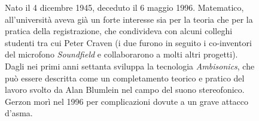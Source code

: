 \vfill\null

\begin{figure}[bh]
\begin{bio}
  Nato il 4 dicembre 1945, deceduto il 6 maggio 1996. Matematico, all'università
  aveva già un forte interesse sia per la teoria che per la pratica della
  registrazione, che condivideva con alcuni colleghi studenti tra cui Peter Craven
  (i due furono in seguito i co-inventori del microfono \emph{Soundfield} e
  collaborarono a molti altri progetti). Dagli nei primi anni settanta sviluppa la
  tecnologia \emph{Ambisonics}, che può essere descritta come un completamento teorico
  e pratico del lavoro svolto da Alan Blumlein nel campo del suono stereofonico.
  Gerzon morì nel 1996 per complicazioni dovute a un grave attacco d'asma.
\end{bio}
\end{figure}
